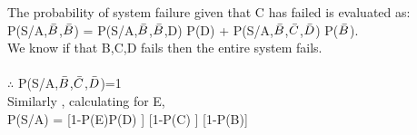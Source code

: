 \documentclass{article}
\begin{document}
\begin{itemize}
The probability of system failure given that C has failed is evaluated
as:\\ \vspace{5mm}
\hspace{15mm}P(S/A,$\Bar{B}$,$\Bar{B}$) = P(S/A,$\Bar{B}$,$\Bar{B}$,D) P(D) + P(S/A,$\Bar{B}$,$\Bar{C}$,$\Bar{D}$) P($\Bar{B}$).  \\
We know if that B,C,D fails then the entire system fails. \\
\\ \vspace{2mm}
\hspace{15mm}$\therefore$ P(S/A,$\Bar{B}$,$\Bar{C}$,$\Bar{D}$)=1 \\
Similarly , calculating for E,\\ \vspace{5mm}
\hspace{15mm}P(S/A) = [1-P(E)P(D) ] [1-P(C) ] [1-P(B)]\\


\end{itemize}
\end{document}
